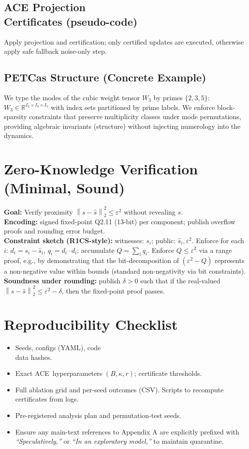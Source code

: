 \documentclass[11pt]{article}
\newcommand{\R}{\mathbb{R}}
\newcommand{\1}{\mathbf{1}}
\newcommand{\norm}[1]{\left\lVert #1 \right\rVert}
\newcommand{\eps}{\varepsilon}
\newcommand{\ACE}{\textsc{ACE}}
\newcommand{\PETC}{\textsc{PETC}}
\begin{document}
\subsection{ACE Projection \\ Certificates (pseudo-code)}
\noindent Apply projection and certification; only certified updates are executed, otherwise apply safe fallback noise-only step.

\subsection{\PETC as Structure (Concrete Example)}
We type the modes of the cubic weight tensor $W_3$ by primes $\{2,3,5\}$: $W_3\in\R^{I_2\times I_3\times I_5}$ with index sets partitioned by prime labels. We enforce block-sparsity constraints that preserve multiplicity classes under mode permutations, providing algebraic invariants (structure) without injecting numerology into the dynamics.

\section{Zero-Knowledge Verification (Minimal, Sound)}
\textbf{Goal:} Verify proximity $\norm{s-\hat{s}}_2^2\le\eps^2$ without revealing $s$.\\
\textbf{Encoding:} signed fixed-point Q2.11 (13-bit) per component; publish overflow proofs and rounding error budget.\\
\textbf{Constraint sketch (R1CS-style):} witnesses: $s_i$; public: $\hat{s}_i,\eps^2$. Enforce for each $i$: $d_i=s_i-\hat{s}_i$, $q_i=d_i\cdot d_i$; accumulate $Q=\sum_i q_i$. Enforce $Q\le\eps^2$ via a range proof, e.g., by demonstrating that the bit-decomposition of $(\eps^2-Q)$ represents a non-negative value within bounds (standard non-negativity via bit constraints).\\
\textbf{Soundness under rounding:} publish $\delta>0$ such that if the real-valued $\norm{s-\hat{s}}_2^2\le\eps^2-\delta$, then the fixed-point proof passes.

\section{Reproducibility Checklist}
\begin{itemize}[leftmargin=1.25em]
  \item Seeds, configs (YAML), code \\ data hashes.
  \item Exact \ACE\ hyperparameters $(B,\kappa,r)$; certificate thresholds.
  \item Full ablation grid and per-seed outcomes (CSV). Scripts to recompute certificates from logs.
  \item Pre-registered analysis plan and permutation-test seeds.
  \item Ensure any main-text references to Appendix A are explicitly prefixed with \emph{“Speculatively,”} or \emph{“In an exploratory model,”} to maintain quarantine.
\end{itemize}
\end{document}
